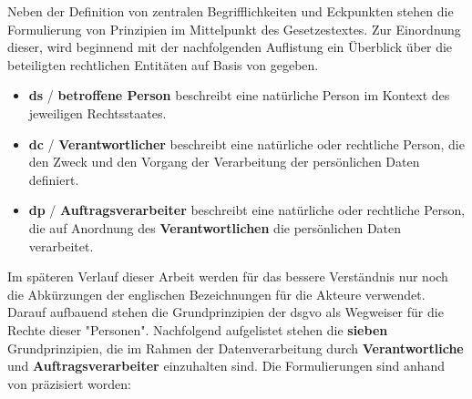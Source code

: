 \noindent Neben der Definition von zentralen Begrifflichkeiten und Eckpunkten stehen die Formulierung von Prinzipien im Mittelpunkt des Gesetzestextes. Zur Einordnung dieser, wird beginnend mit der nachfolgenden Auflistung ein Überblick über die beteiligten rechtlichen Entitäten auf Basis von \cite{DSGVOArt4} gegeben.

\begin{itemize}
    \item \textbf{\acl{ds}} / \textbf{betroffene Person} beschreibt eine natürliche Person im Kontext des jeweiligen Rechtsstaates.
    \item \textbf{\acl{dc}} / \textbf{Verantwortlicher} beschreibt eine natürliche oder rechtliche Person, die den Zweck und den Vorgang der Verarbeitung der persönlichen Daten definiert.
    \item \textbf{\acl{dp}} / \textbf{Auftragsverarbeiter} beschreibt eine natürliche oder rechtliche Person, die auf Anordnung des \textbf{Verantwortlichen} die persönlichen Daten verarbeitet.
\end{itemize}

\noindent Im späteren Verlauf dieser Arbeit werden für das bessere Verständnis nur noch die Abkürzungen der englischen Bezeichnungen für die Akteure verwendet. Darauf aufbauend stehen die Grundprinzipien der \ac{dsgvo} als Wegweiser für die Rechte dieser "Personen". Nachfolgend aufgelistet stehen die \textbf{sieben} Grundprinzipien, die im Rahmen der Datenverarbeitung durch \textbf{Verantwortliche} und \textbf{Auftragsverarbeiter} einzuhalten sind. Die Formulierungen sind anhand von \cite{DSGVOArt5} präzisiert worden:

